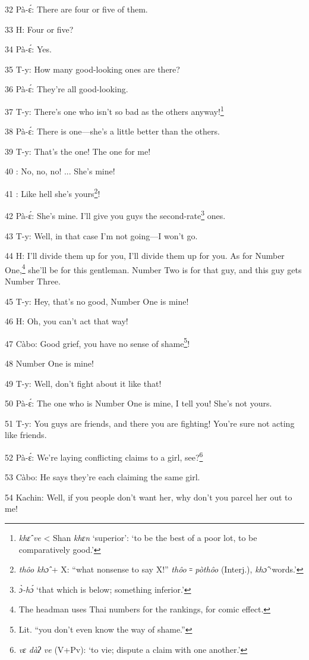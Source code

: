 32 Pà-ɛ́: There are four or five of them.

33 H: Four or five?

34 Pà-ɛ́: Yes.

35 T-y: How many good-looking ones are there?

36 Pà-ɛ́: They're all good-looking.

37 T-y: There's one who isn't so bad as the others anyway!\footnote{\textit{khɛ̂ ve} < Shan \textit{khɛn} `superior': `to be the best of a poor lot, to be comparatively good.'}

38 Pà-ɛ́: There is one---she's a little better than the others.

39 T-y: That's the one! The one for me!

40       : No, no, no! ... She's mine!

41       : Like hell she's yours\footnote{\textit{thôo khɔ̂} + X: ``what nonsense to say X!'' \textit{thôo} ꞊ \textit{pòthôo} (Interj.), \textit{khɔ̂} `words.'}!

42 Pà-ɛ́: She's mine. I'll give you guys the second-rate\footnote{\textit{ɔ̀-hɔ́} `that which is below; something inferior.'} ones.

43 T-y: Well, in that case I'm not going---I won't go.

44 H: I'll divide them up for you, I'll divide them up for you. As for Number One,\footnote{The headman uses Thai numbers for the rankings, for comic effect.}
she'll be for this gentleman. Number Two is for that guy, and this guy gets Number
Three.

45 T-y: Hey, that's no good, Number One is mine!

46 H: Oh, you can't act that way!

47 Càbo: Good grief, you have no sense of shame\footnote{Lit. ``you don't even know the way of shame.''}!

48 Number One is mine!

49 T-y: Well, don't fight about it like that!

50 Pà-ɛ́: The one who is Number One is mine, I tell you! She's not yours.

51 T-y: You guys are friends, and there you are fighting! You're sure not acting
like friends.

52 Pà-ɛ́: We're laying conflicting claims to a girl, see?\footnote{\textit{vɛ dàʔ ve }(V+Pv): `to vie; dispute a claim with one another.'}

53 Càbo: He says they're each claiming the same girl.

54 Kachin: Well, if you people don't want her, why don't you parcel her out to
me!

